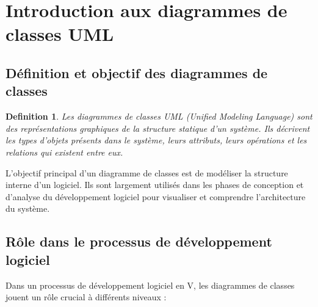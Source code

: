 \documentclass{article}
\newtheorem{definition}{Definition}
\begin{document}
\sloppy

\section{Introduction aux diagrammes de classes UML}

\subsection{Définition et objectif des diagrammes de classes}

\begin{definition}
Les diagrammes de classes UML (Unified Modeling Language) sont des représentations graphiques de la structure statique d'un système. Ils décrivent les types d'objets présents dans le système, leurs attributs, leurs opérations et les relations qui existent entre eux.
\end{definition}

\medskip

L'objectif principal d'un diagramme de classes est de modéliser la structure interne d'un logiciel. Ils sont largement utilisés dans les phases de conception et d'analyse du développement logiciel pour visualiser et comprendre l'architecture du système.

\subsection{Rôle dans le processus de développement logiciel}

Dans un processus de développement logiciel en V, les diagrammes de classes jouent un rôle crucial à différents niveaux :
\end{document}
